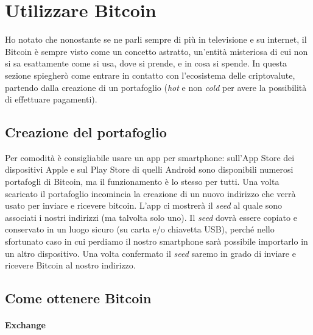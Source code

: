\documentclass {article}
\begin{document}
\newpage


\section {Utilizzare Bitcoin}


Ho notato che nonostante se ne parli sempre di più in televisione e su internet, il Bitcoin è sempre visto come un concetto astratto, un'entità misteriosa di cui non si sa esattamente come si usa, dove si prende, e in cosa si spende.
In questa sezione spiegherò come entrare in contatto con l'ecosistema delle criptovalute, partendo dalla creazione di un portafoglio (\textit{hot} e non \textit{cold} per avere la possibilità di effettuare pagamenti).


\subsection {Creazione del portafoglio}


Per comodità è consigliabile usare un app per smartphone: sull'App Store dei dispositivi Apple e sul Play Store di quelli Android sono disponibili numerosi portafogli di Bitcoin, ma il funzionamento è lo stesso per tutti.
Una volta scaricato il portafoglio incomincia la creazione di un nuovo indirizzo che verrà usato per inviare e ricevere bitcoin.
L'app ci mostrerà il \textit{seed} al quale sono associati i nostri indirizzi (ma talvolta solo uno).
Il \textit{seed} dovrà essere copiato e conservato in un luogo sicuro (su carta e/o chiavetta USB), perché nello sfortunato caso in cui perdiamo il nostro smartphone sarà possibile importarlo in un altro dispositivo.
Una volta confermato il \textit{seed} saremo in grado di inviare e ricevere Bitcoin al nostro indirizzo.


\subsection {Come ottenere Bitcoin}


\paragraph {Exchange}
\end{document}
